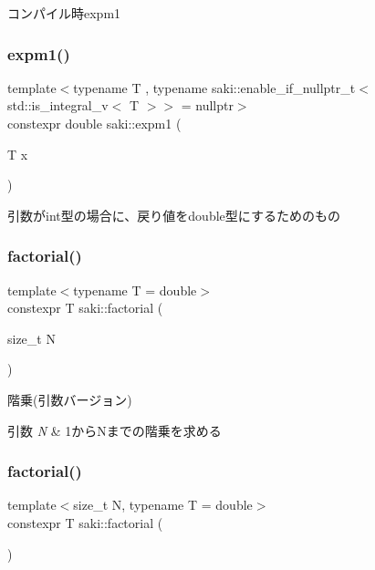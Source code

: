 コンパイル時expm1 

\mbox{\label{namespacesaki_ae4490f448ed3d82712306c54d6821788}} 
\subsubsection{\texorpdfstring{expm1()}{expm1()}\hspace{0.1cm}{\footnotesize\ttfamily [2/2]}}
{\footnotesize\ttfamily template$<$typename T , typename saki\+::enable\+\_\+if\+\_\+nullptr\+\_\+t$<$ std\+::is\+\_\+integral\+\_\+v$<$ T $>$$>$  = nullptr$>$ \\
constexpr double saki\+::expm1 (\begin{DoxyParamCaption}\item[{T}]{x }\end{DoxyParamCaption})}



引数がint型の場合に、戻り値をdouble型にするためのもの 

\mbox{\label{namespacesaki_a224c4843b72acf995e13809a5caaafd8}} 
\subsubsection{\texorpdfstring{factorial()}{factorial()}\hspace{0.1cm}{\footnotesize\ttfamily [1/2]}}
{\footnotesize\ttfamily template$<$typename T  = double$>$ \\
constexpr T saki\+::factorial (\begin{DoxyParamCaption}\item[{size\+\_\+t}]{N }\end{DoxyParamCaption})}



階乗(引数バージョン) 


\begin{DoxyParams}{引数}
{\em N} & 1から\+Nまでの階乗を求める \\
\hline
\end{DoxyParams}
\mbox{\label{namespacesaki_a9dead910b791cee99cf82d1bd2a5d90c}} 
\subsubsection{\texorpdfstring{factorial()}{factorial()}\hspace{0.1cm}{\footnotesize\ttfamily [2/2]}}
{\footnotesize\ttfamily template$<$size\+\_\+t N, typename T  = double$>$ \\
constexpr T saki\+::factorial (\begin{DoxyParamCaption}{ }\end{DoxyParamCaption})}



